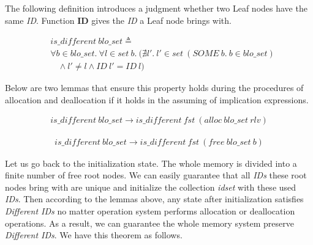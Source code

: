 The following definition introduces a judgment whether two Leaf nodes have the same \emph{ID}. Function \textbf{ID} gives the \emph{ID} a Leaf node brings with.

\begin{definition} 
\vspace{-7pt}
\end{definition}
{\footnotesize
\begin{align*}
&is\_different\ blo\_set \triangleq \\
&\forall b \in blo\_set.\ \forall l \in set\ b.\ (\nexists l'.\ l' \in set\ (SOME\ b.\ b \in blo\_set) \\
&\ \ \ \ \wedge l' \ne l \wedge ID\ l' = ID\ l)
\end{align*}
}
\vspace{-12pt}

Below are two lemmas that ensure this property holds during the procedures of allocation and deallocation if it holds in the assuming of implication expressions.

\begin{lemma} 
\vspace{-7pt}
\end{lemma}
{\footnotesize
\begin{align*}
is\_different\ blo\_set \longrightarrow is\_different\ fst\ (alloc\ blo\_set\ rlv)
\end{align*}
}
\vspace{-12pt}

\begin{lemma} 
\vspace{-7pt}
\end{lemma}
{\footnotesize
\begin{align*}
is\_different\ blo\_set \longrightarrow is\_different\ fst\ (free\ blo\_set\ b)
\end{align*}
}
\vspace{-12pt}

Let us go back to the initialization state. The whole memory is divided into a finite number of free root nodes. We can easily guarantee that all \emph{IDs} these root nodes bring with are unique and initialize the collection \emph{idset} with these used \emph{IDs}. Then according to the lemmas above, any state after initialization satisfies \emph{Different IDs} no matter operation system performs allocation or deallocation operations. As a result, we can guarantee the whole memory system preserve \emph{Different IDs}. We have this theorem as follows.

